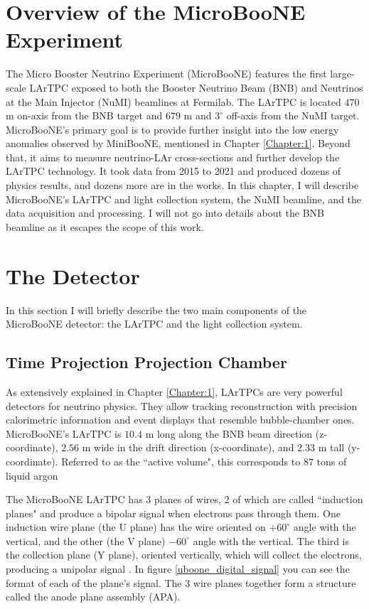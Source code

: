 \section{Overview of the MicroBooNE Experiment}
\label{Chapter:2}
The Micro Booster Neutrino Experiment (MicroBooNE) features the first large-scale LArTPC exposed to both the Booster Neutrino Beam (BNB) and Neutrinos at the Main Injector (NuMI) beamlines at Fermilab. The LArTPC is located $470$ m on-axis from the BNB target and $679$ m and $3^{\circ}$ off-axis from the NuMI target. MicroBooNE's primary goal is to provide further insight into the low energy anomalies observed by MiniBooNE, mentioned in Chapter \ref{Chapter:1}. Beyond that, it aims to measure neutrino-LAr cross-sections and further develop the LArTPC technology. It took data from 2015 to 2021 and produced dozens of physics results, and dozens more are in the works. 
In this chapter, I will describe MicroBooNE's LArTPC and light collection system, the NuMI beamline, and the data acquisition and processing. I will not go into details about the BNB beamline as it escapes the scope of this work.

\section{The Detector}

In this section I will briefly describe the two main components of the MicroBooNE detector: the LArTPC and the light collection system.
\subsection{Time Projection Projection Chamber}
As extensively explained in Chapter \ref{Chapter:1}, LArTPCs are very powerful detectors for neutrino physics. They allow tracking reconstruction with precision calorimetric information and event displays that resemble bubble-chamber ones. MicroBooNE's LArTPC is $10.4$ m long along the BNB beam direction (z-coordinate), $2.56$ m wide in the drift direction (x-coordinate), and $2.33$ m tall (y-coordinate). Referred to as the ``active volume", this corresponds to $87$ tons of liquid argon  

The MicroBooNE LArTPC has $3$ planes of wires, $2$ of which are called ``induction planes" and produce a bipolar signal when electrons pass through them. One induction wire plane (the U plane) has the wire oriented on $+60^{\circ}$ angle with the vertical, and the other (the V plane) $-60^{\circ}$ angle with the vertical. The third is the collection plane (Y plane), oriented vertically, which will collect the electrons, producing a unipolar signal \cite{microboone_electronics}. In figure \ref{uboone_digital_signal} you can see the format of each of the plane's signal. The $3$ wire planes together form a structure called the anode plane assembly (APA). 

